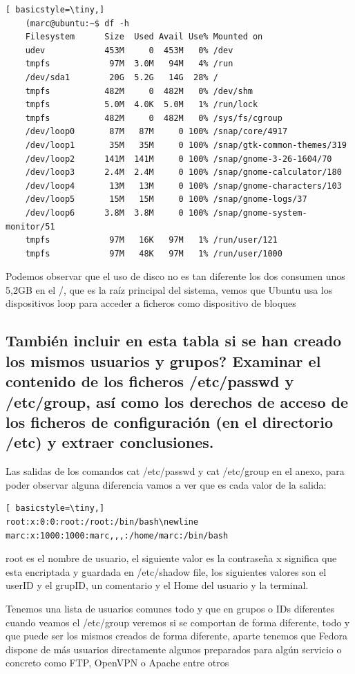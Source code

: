 \documentclass[preprint,11pt]{elsarticle}
\begin{document}
\begin{lstlisting}[ basicstyle=\tiny,]
    (marc@ubuntu:~$ df -h
    Filesystem      Size  Used Avail Use% Mounted on
    udev            453M     0  453M   0% /dev
    tmpfs            97M  3.0M   94M   4% /run
    /dev/sda1        20G  5.2G   14G  28% /
    tmpfs           482M     0  482M   0% /dev/shm
    tmpfs           5.0M  4.0K  5.0M   1% /run/lock
    tmpfs           482M     0  482M   0% /sys/fs/cgroup
    /dev/loop0       87M   87M     0 100% /snap/core/4917
    /dev/loop1       35M   35M     0 100% /snap/gtk-common-themes/319
    /dev/loop2      141M  141M     0 100% /snap/gnome-3-26-1604/70
    /dev/loop3      2.4M  2.4M     0 100% /snap/gnome-calculator/180
    /dev/loop4       13M   13M     0 100% /snap/gnome-characters/103
    /dev/loop5       15M   15M     0 100% /snap/gnome-logs/37
    /dev/loop6      3.8M  3.8M     0 100% /snap/gnome-system-monitor/51
    tmpfs            97M   16K   97M   1% /run/user/121
    tmpfs            97M   48K   97M   1% /run/user/1000

\end{lstlisting}
Podemos observar que el uso de disco no es tan diferente los dos consumen unos 5,2GB en el /, que es la raíz principal del sistema, vemos que Ubuntu usa los dispositivos loop para acceder a ficheros como dispositivo de bloques 

\subsection{También incluir en esta tabla si se han creado los mismos usuarios y grupos? Examinar el contenido de los ficheros /etc/passwd y /etc/group, así como los derechos de acceso de los ficheros de configuración (en el directorio /etc) y extraer conclusiones.}

Las salidas de los comandos cat /etc/passwd y cat /etc/group en el anexo, para poder observar alguna diferencia vamos a ver que es cada valor de la salida:
\begin{lstlisting}[ basicstyle=\tiny,]
root:x:0:0:root:/root:/bin/bash\newline
marc:x:1000:1000:marc,,,:/home/marc:/bin/bash
\end{lstlisting}
root es el nombre de usuario, el siguiente valor es la contraseña x significa que esta encriptada y guardada en /etc/shadow file, los siguientes valores son el userID y el grupID, un comentario y el Home del usuario y la terminal.

Tenemos una lista de usuarios comunes todo y que en grupos o IDs diferentes cuando veamos el /etc/group veremos si se comportan de forma diferente, todo y que puede ser los mismos creados de forma diferente, aparte tenemos que Fedora dispone de más usuarios directamente algunos preparados para algún servicio o concreto como FTP, OpenVPN o Apache entre otros
\end{document}
